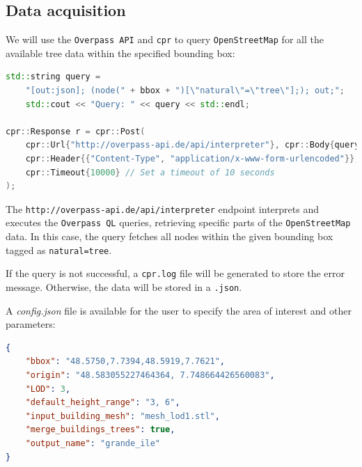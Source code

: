 \documentclass[12pt]{article}
\begin{document}
\subsection{Data acquisition}

We will use the \texttt{Overpass API} and \texttt{cpr} to query
\texttt{OpenStreetMap} for all the available tree data within the specified
bounding box:

\begin{lstlisting}[language=C++]
std::string query =
    "[out:json]; (node(" + bbox + ")[\"natural\"=\"tree\"];); out;";
    std::cout << "Query: " << query << std::endl;

cpr::Response r = cpr::Post(
    cpr::Url{"http://overpass-api.de/api/interpreter"}, cpr::Body{query},
    cpr::Header{{"Content-Type", "application/x-www-form-urlencoded"}},
    cpr::Timeout{10000} // Set a timeout of 10 seconds
);
\end{lstlisting}

The \texttt{http://overpass-api.de/api/interpreter} endpoint interprets and
executes the \texttt{Overpass QL}\cite{overpass-ql} queries, retrieving
specific parts of the \texttt{OpenStreetMap} data. In this case, the query
fetches all nodes within the given bounding box tagged as \texttt{natural=tree}.

If the query is not successful, a \texttt{cpr.log} file will be generated to
store the error message. Otherwise, the data will be stored in a \texttt{.json}.

A \textit{config.json} file is available for the user to specify the area of
interest and other parameters:

\begin{lstlisting}[language=json]
{
    "bbox": "48.5750,7.7394,48.5919,7.7621",
    "origin": "48.583055227464364, 7.748664426560083",
    "LOD": 3,
    "default_height_range": "3, 6",
    "input_building_mesh": "mesh_lod1.stl",
    "merge_buildings_trees": true,
    "output_name": "grande_ile"
}
\end{lstlisting}
\end{document}
